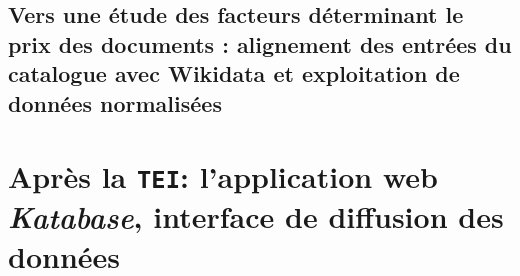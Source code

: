 \documentclass[a4paper, 12pt, twoside]{book}
\newcommand{\tei}{\texttt{TEI}}
\begin{document}
\chapter{Vers une étude des facteurs déterminant le prix des documents : alignement des entrées du catalogue avec Wikidata et exploitation de données normalisées}





\part{Après la \tei : l'application web \textit{Katabase}, interface de diffusion des données}

\listoffigures
\listoftables
\tableofcontents
\end{document}
